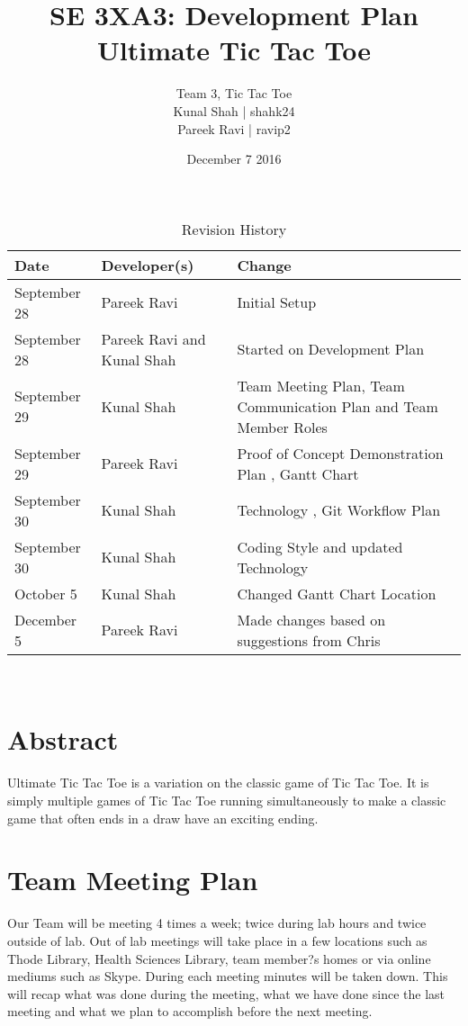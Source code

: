 \documentclass{article}
\title{SE 3XA3: Development Plan\\Ultimate Tic Tac Toe}
\author{Team 3, Tic Tac Toe
		\\ Kunal Shah | shahk24
		\\ Pareek Ravi | ravip2
}
\date{December 7 2016}
\begin{document}
\maketitle

\tableofcontents

\newpage

\begin{table}[hp]
\caption{Revision History} \label{TblRevisionHistory}
\begin{tabularx}{\textwidth}{llX}
\toprule
\textbf{Date} & \textbf{Developer(s)} & \textbf{Change}\\
\midrule
September 28 & Pareek Ravi & Initial Setup\\
September 28 & Pareek Ravi and Kunal Shah & Started on Development Plan\\
September 29 & Kunal Shah & Team Meeting Plan, Team Communication Plan and Team Member Roles\\
September 29 & Pareek Ravi & Proof of Concept Demonstration Plan , Gantt Chart\\
September 30 & Kunal Shah & Technology , Git Workflow Plan \\
September 30 & Kunal Shah & Coding Style and updated Technology\\
October 5 & Kunal Shah & Changed Gantt Chart Location\\
December 5 & Pareek Ravi & Made changes based on suggestions from Chris\\

\bottomrule
\end{tabularx}
\end{table}
\newpage

 \\
\section*{Abstract}
Ultimate Tic Tac Toe is a variation on the classic game of Tic Tac Toe. It is 
simply multiple games of Tic Tac Toe running simultaneously to make a classic 
game that often ends in a draw have an exciting ending.

\section{Team Meeting Plan}
Our Team will be meeting 4 times a week; twice during lab hours and twice 
outside of lab. Out of lab meetings will take place in a few locations such as
Thode Library, Health Sciences Library, team member?s homes or via online 
 mediums such as Skype. During each meeting minutes will be taken down. 
 This will recap what was done during the meeting, what we have done since the 
last meeting and what we plan to accomplish before the next meeting.
\end{document}
